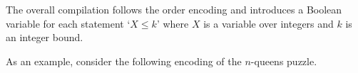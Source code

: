 The overall compilation follows the order encoding \cite{tatakiba09a} and
introduces a Boolean variable for each statement `$X\leq k$' where $X$ is a variable over integers and $k$ is an integer bound.

As an example,
consider the following encoding of the $n$-queens puzzle.



